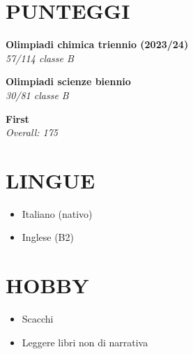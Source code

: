 \documentclass[11pt,a4paper]{moderncv}
\newcommand*{\scoreentry}[3][2.5mm]{
    {\bfseries #2} \\
    {\itshape #3}
    \par\addvspace{#1}
}
\begin{document}
\begin{minipage}[t]{0.35\textwidth}
\section{PUNTEGGI}
\scoreentry{Olimpiadi chimica triennio (2023/24)}{57/114 classe B}
\scoreentry{Olimpiadi scienze biennio}{30/81 classe B}
\scoreentry{First}{Overall: 175}
\section{LINGUE}
\begin{itemize}
    \item Italiano (nativo)
    \item Inglese (B2)
\end{itemize}

\section{HOBBY}
\begin{itemize}
    \item Scacchi
    \item Leggere libri non di narrativa
\end{itemize}
\end{minipage}
\end{document}
